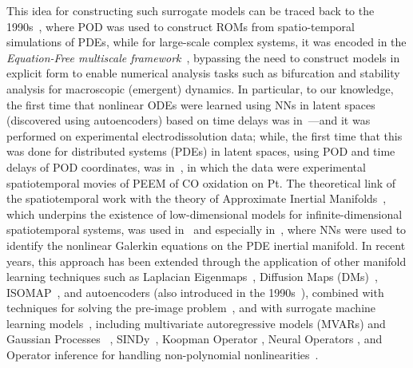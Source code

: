 \documentclass{article}
\begin{document}
This idea for constructing such surrogate models can be traced back to the 1990s~\cite{deane1991low,rico1992discrete,krischer1993model,temam1995navier,graham1996alternative,shvartsman1998low,shvartsman2000order}, where POD was used to construct ROMs from spatio-temporal simulations of PDEs, while for large-scale complex systems, it was encoded in the \textit{Equation-Free multiscale framework}~\cite{kevrekidis2003equation}, bypassing the need to construct models in explicit form to enable numerical analysis tasks such as bifurcation and stability analysis for macroscopic (emergent) dynamics. In particular, to our knowledge, the first time that nonlinear ODEs were learned using NNs in latent spaces (discovered using autoencoders) based on time delays was in~\cite{rico1992discrete}—and it was performed on experimental electrodissolution data; while, the first time that this was done for distributed systems (PDEs) in latent spaces, using POD and time delays of POD coordinates, was in~\cite{krischer1993model}, in which the data were experimental spatiotemporal movies of PEEM of CO oxidation on Pt. The theoretical link of the spatiotemporal work with the theory of Approximate Inertial Manifolds~\cite{titi1990approximate,temam1995navier,constantin2012integral,koronaki2024nonlinear}, which underpins the existence of low-dimensional models for infinite-dimensional spatiotemporal systems, was used in~\cite{shvartsman1998low} and especially in~\cite{shvartsman2000order}, where NNs were used to identify the nonlinear Galerkin equations on the PDE inertial manifold. In recent years, this approach has been extended through the application of other manifold learning techniques such as Laplacian Eigenmaps~\cite{belkin2003laplacian,belkin2008towards}, Diffusion Maps (DMs)~\cite{coifman2005geometric,coifman2006diffusion,coifman2008diffusion,kemeth2018emergent,dsilva2018parsimonious,soize2022probabilistic,soize2024transient,Patsatzis_2023,chin2024enabling}, ISOMAP~\cite{tenenbaum2000global,bollt2007attractor}, and autoencoders (also introduced in the 1990s~\cite{kramer1991nonlinear}), combined with techniques for solving the pre-image problem~\cite{coifman2006geometric,chiavazzo2014reduced,papaioannou2022time,evangelou2022double,Patsatzis_2023}, and with surrogate machine learning models~\cite{papaioannou2022time,charalampopoulos2022uncertainty,vlachas2022multiscale,floryan2022data,conti2023reduced,gallos2024data,koronaki2024nonlinear,constante2024data,fabiani2024task,faraji2025shallow}, including multivariate autoregressive models (MVARs) and Gaussian Processes ~\cite{papaioannou2022time}, SINDy~\cite{brunton2016discovering,Rudy2017,conti2023reduced}, Koopman Operator \cite{gallos2024data}, Neural Operators \cite{kontolati2024learning}, and Operator inference for handling non-polynomial nonlinearities~\cite{Benner2020, Kramer2024}.
\end{document}
